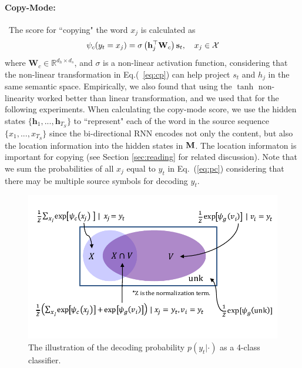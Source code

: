 \paragraph{Copy-Mode:}~The score for ``copying" the word $x_j$ is calculated as \vspace{-7pt}
\begin{equation}\label{eq:cp}
	\psi_c(y_t=x_j) =	\sigma\left(\mathbf{h}_j^\top \mathbf{W}_c\right)\mathbf{s}_t, \quad  x_j \in \calX \vspace{-7pt}
\end{equation}
where $\mathbf{W}_c\in \mathbb{R}^{d_h \times d_s}$, and $\sigma$ is a non-linear activation function, considering that the non-linear transformation in Eq.(~\ref{eq:cp}) can help project $s_t$ and $h_j$ in the same semantic space. Empirically,  we also found that using the $\tanh$ non-linearity worked better than linear transformation, and we used that for the following experiments.
When calculating the copy-mode score, we use the hidden states $\{\mathbf{h}_1, ..., \mathbf{h}_{T_S}\}$ to ``represent" each of the word in the source sequence $\{x_1, ..., x_{T_S}\}$ since the bi-directional RNN encodes not only the content, 
but also the location information into the hidden states in $\mathbf{M}$. The location informaton is important for copying (see Section \ref{sec:reading} for related discussion). 
Note that we sum the probabilities of all $x_j$ equal to $y_t$ in Eq.~(\ref{eq:pc}) considering that there may be multiple source symbols for decoding $y_t$. 
\begin{figure}[t!]
   	\centering
          	\includegraphics[width=0.85\linewidth]{figs/copynet/oov.pdf} 
          	\caption{\label{oov} The illustration of  the decoding probability $p(y_t|\cdot)$
          	 as a 4-class classifier. } 
   \vspace{-5pt}
  \end{figure}   
